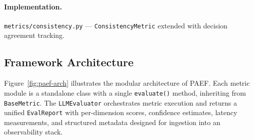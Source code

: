 \documentclass{article}
\begin{document}
\begin{sloppypar}\paragraph{Implementation.} \texttt{metrics/consistency.py} ---
\texttt{ConsistencyMetric} extended with decision agreement tracking.\end{sloppypar}

\subsection{Framework Architecture}

Figure~\ref{fig:paef-arch} illustrates the modular architecture of PAEF.
Each metric module is a standalone class with a single \texttt{evaluate()}
method, inheriting from \texttt{BaseMetric}.  The
\texttt{LLMEvaluator} orchestrates metric execution and returns a unified
\texttt{EvalReport} with per-dimension scores, confidence estimates, latency
measurements, and structured metadata designed for ingestion into an
observability stack.
\end{document}

